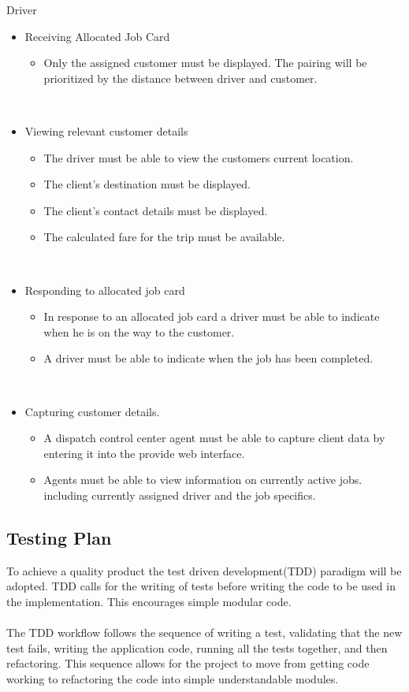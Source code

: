 \documentclass[10pt,twocolumn]{witseiepaper}
\begin{document}
Driver
\begin{itemize} 
\item Receiving Allocated Job Card
\begin{itemize}
\item Only the assigned customer must be displayed. The pairing will be prioritized by the distance between driver and customer.
\end{itemize}\

\item Viewing relevant customer details
\begin{itemize}
\item The driver must be able to view the customers current location.
\item The client's destination must be displayed.
\item The client's contact details must be displayed.
\item The calculated fare for the trip must be available.
\end{itemize}\

\item  Responding to allocated job card
\begin{itemize}
\item In response to an allocated job card a driver must be able to indicate when he is on the way to the customer.
\item A driver must be able to indicate when the job has been completed.
\end{itemize}\

\item Capturing customer details.
\begin{itemize}
\item A dispatch control center agent must be able to capture client data by entering it into the provide web interface.
\item Agents must be able to view information on currently active jobs. including currently assigned driver and the job specifics.
\end{itemize}
\end{itemize}

\subsection{Testing Plan}

To achieve a quality product the test driven development(TDD) paradigm will be adopted. TDD calls for the writing of tests before writing the code to be used in the implementation. This encourages simple modular code.\\\\
 The TDD workflow follows the sequence of writing a test, validating that the new test fails, writing the application code, running all the tests together, and then refactoring. This sequence allows for the project to move from getting code working to refactoring the code into simple understandable modules.
\end{document}

